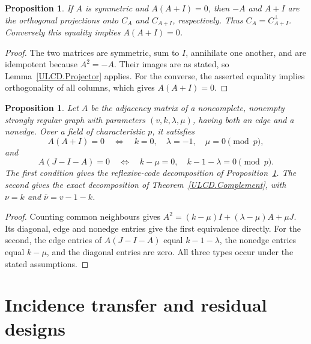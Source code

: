 \documentclass[11pt,a4paper]{article}
\newtheorem{proposition}[theorem]{Proposition}
\numberwithin{equation}{section}
\begin{document}
\begin{proposition}\label{ULCD.Reflexive}
If $A$ is symmetric and $A(A+I)=0$, then $-A$ and $A+I$ are the
orthogonal projections onto $C_A$ and $C_{A+I}$, respectively. Thus
$C_A=C_{A+I}^{\perp}$. Conversely this equality implies $A(A+I)=0$.
\end{proposition}
\begin{proof}
The two matrices are symmetric, sum to $I$, annihilate one another, and
are idempotent because $A^2=-A$. Their images are as stated, so
Lemma~\ref{ULCD.Projector} applies. For the converse, the asserted equality
implies orthogonality of all columns, which gives $A(A+I)=0$.
\end{proof}

\begin{proposition}\label{ULCD.SRG}
Let $A$ be the adjacency matrix of a noncomplete, nonempty strongly regular
graph with parameters $(v,k,\lambda,\mu)$, having both an edge and a
nonedge. Over a field of characteristic $p$, it satisfies
\[
 A(A+I)=0\quad\Longleftrightarrow\quad
 k=0,\quad\lambda=-1,\quad\mu=0 \pmod p,
\]
and
\[
 A(J-I-A)=0\quad\Longleftrightarrow\quad
 k-\mu=0,\quad k-1-\lambda=0\pmod p.
\]
The first condition gives the reflexive-code decomposition of
Proposition~\ref{ULCD.Reflexive}. The second gives the exact decomposition
of Theorem~\ref{ULCD.Complement}, with $\nu=k$ and $\bar\nu=v-1-k$.
\end{proposition}
\begin{proof}
Counting common neighbours gives
$A^2=(k-\mu)I+(\lambda-\mu)A+\mu J$.
Its diagonal, edge and nonedge entries give the first equivalence directly.
For the second, the edge entries of $A(J-I-A)$ equal $k-1-\lambda$,
the nonedge entries equal $k-\mu$, and the diagonal entries are zero.
All three types occur under the stated assumptions.
\end{proof}

\section{Incidence transfer and residual designs}
\end{document}
